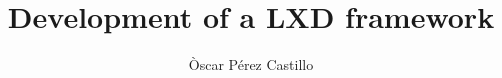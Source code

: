 \documentclass[a4paper,12pt]{article}
\title{Development of a LXD framework}
\author{Òscar Pérez Castillo}
\begin{document}



\newpage


\newpage


\newpage





\newpage
\tableofcontents


\newpage
\listoffigures

\lstlistoflistings
{}





\newpage


\label{sec:state}



\clearpage
\label{sec:methodology}


\clearpage
\label{sec:implementation}




\clearpage
\label{sec:budget}


\label{sec:conclusions}


\label{sec:futurework}





\newpage

\medskip



\nocite{*}     %

\clearpage
\newpage
\begin{appendices}
    
    
    
\end{appendices}
\end{document}
